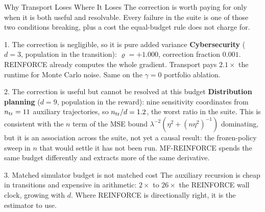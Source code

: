 \documentclass[9pt]{beamer}
\begin{document}
\begin{frame}{Why Transport Loses Where It Loses}
\small
The correction is worth paying for only when it is both useful and resolvable. Every failure in the suite is one of those two conditions breaking, plus a cost the equal-budget rule does not charge for.

\vspace{0.2cm}
\begin{block}{1. The correction is negligible, so it is pure added variance}
\textbf{Cybersecurity} ($d=3$, population in the transition): $\varrho=+1.000$, correction fraction $0.001$. REINFORCE already computes the whole gradient. Transport pays $2.1\times$ the runtime for Monte Carlo noise. Same on the $\gamma=0$ portfolio ablation.
\end{block}

\vspace{-0.1cm}
\begin{block}{2. The correction is useful but cannot be resolved at this budget}
\textbf{Distribution planning} ($d=9$, population in the reward): nine sensitivity coordinates from $n_{\rm tr}=11$ auxiliary trajectories, so $n_{\rm tr}/d=1.2$, the worst ratio in the suite. This is consistent with the $n$ term of the MSE bound $\lambda^{-2}(\eta^2+(n\eta^2)^{-1})$ dominating, but it is an association across the suite, not yet a causal result: the frozen-policy sweep in $n$ that would settle it has not been run. MF-REINFORCE spends the same budget differently and extracts more of the same derivative.
\end{block}

\vspace{-0.1cm}
\begin{block}{3. Matched simulator budget is not matched cost}
The auxiliary recursion is cheap in transitions and expensive in arithmetic: $2\times$ to $26\times$ the REINFORCE wall clock, growing with $d$. Where REINFORCE is directionally right, it is the estimator to use.
\end{block}
\end{frame}
\end{document}

